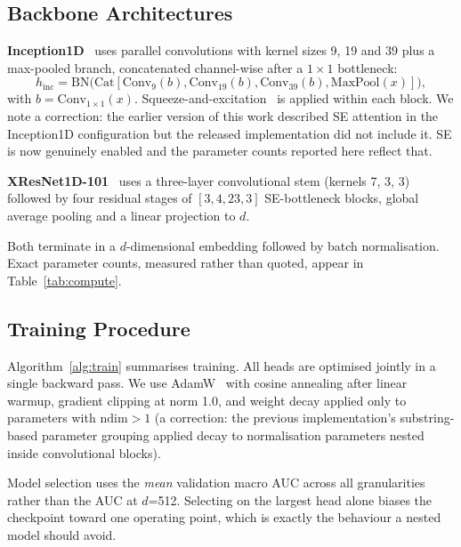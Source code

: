 \subsection{Backbone Architectures}

\textbf{Inception1D}~\cite{ismailfawaz2020} uses parallel convolutions with
kernel sizes 9, 19 and 39 plus a max-pooled branch, concatenated
channel-wise after a $1\times1$ bottleneck:
\begin{equation}
h_{\mathrm{inc}} = \mathrm{BN}\big(\mathrm{Cat}[\mathrm{Conv}_9(b),
\mathrm{Conv}_{19}(b), \mathrm{Conv}_{39}(b), \mathrm{MaxPool}(x)]\big),
\end{equation}
with $b = \mathrm{Conv}_{1\times1}(x)$. Squeeze-and-excitation~\cite{hu2018}
is applied within each block. We note a correction: the earlier version of
this work described SE attention in the Inception1D configuration but the
released implementation did not include it. SE is now genuinely enabled and
the parameter counts reported here reflect that.

\textbf{XResNet1D-101}~\cite{he2016,strodthoff2021} uses a three-layer
convolutional stem (kernels 7, 3, 3) followed by four residual stages of
$[3,4,23,3]$ SE-bottleneck blocks, global average pooling and a linear
projection to $d$.

Both terminate in a $d$-dimensional embedding followed by batch
normalisation. Exact parameter counts, measured rather than quoted, appear in
Table~\ref{tab:compute}.

\subsection{Training Procedure}

Algorithm~\ref{alg:train} summarises training. All heads are optimised jointly
in a single backward pass. We use AdamW~\cite{loshchilov2019} with cosine
annealing after linear warmup, gradient clipping at norm 1.0, and weight decay
applied only to parameters with $\mathrm{ndim} > 1$ (a correction: the
previous implementation's substring-based parameter grouping applied decay to
normalisation parameters nested inside convolutional blocks).

Model selection uses the \emph{mean} validation macro AUC across all
granularities rather than the AUC at $d$=512. Selecting on the largest head
alone biases the checkpoint toward one operating point, which is exactly the
behaviour a nested model should avoid.

